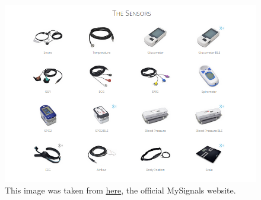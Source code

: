 \begin{figure}[ht!]
\centering
\begin{minipage}{.9\textwidth}
  \centering \includegraphics[width=1.0\linewidth]{../images/manual/sensors.png}
 \caption{This image was taken from \href{http://www.my-signals.com/} {here}, the official MySignals website. }
\end{minipage}
\end{figure}
